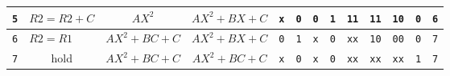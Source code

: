 \documentclass[12pt]{article}
\begin{document}
\begin{center}
\begin{tabular}{|c|l|c|c||c|c|c|c|c|c|c|c|c|}
		\texttt{5}                     & $R2=R2+C    $                                     & $AX^2$                   & $AX^2+BX+C$              & \texttt{x}               & \texttt{0}              & \texttt{0}               & \texttt{1}              & \texttt{11}              & \texttt{11}             & \texttt{10}             & \texttt{0}               & \texttt{6}                  \\\hline
		\texttt{6}                     & $R2=R1      $                                     & $AX^2+BC+C$              & $AX^2+BX+C$              & \texttt{0}               & \texttt{1}              & \texttt{x}               & \texttt{0}              & \texttt{xx}              & \texttt{10}             & \texttt{00}             & \texttt{0}               & \texttt{7}                  \\\hline
		\texttt{7}                     & \multicolumn{1}{c|}{hold}                         & $AX^2+BC+C$              & $AX^2+BC+C$              & \texttt{x}               & \texttt{0}              & \texttt{x}               & \texttt{0}              & \texttt{xx}              & \texttt{xx}             & \texttt{xx}             & \texttt{1}               & \texttt{7}                  \\\hline
	\end{tabular}
\end{center}
\end{document}
